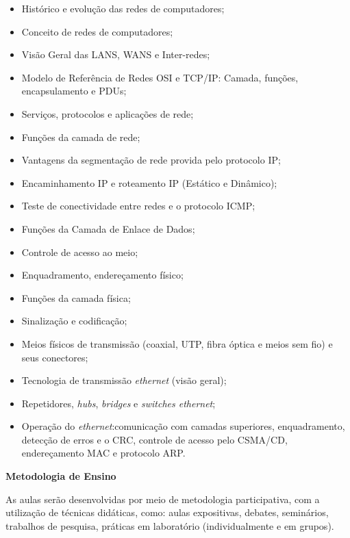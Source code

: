 \begin{itemize}

 \item Histórico e evolução das redes de computadores;
 \item Conceito de redes de computadores;
 \item Visão Geral das LANS, WANS e Inter-redes;
 \item Modelo de Referência de Redes OSI e TCP/IP: Camada, funções, encapsulamento e PDUs;
 \item Serviços, protocolos e aplicações de rede;
 \item Funções da camada de rede;
 \item Vantagens da segmentação de rede provida pelo protocolo IP;
 \item Encaminhamento IP e roteamento IP (Estático e Dinâmico);
 \item Teste de conectividade entre redes e o protocolo ICMP;
 \item Funções da Camada de Enlace de Dados;
 \item Controle de acesso ao meio;
 \item Enquadramento, endereçamento físico;
 \item Funções da camada física;
 \item Sinalização e codificação;
 \item Meios físicos de transmissão (coaxial, UTP, fibra óptica e meios sem fio) e seus conectores;
 \item Tecnologia de transmissão \textit{ethernet} (visão geral);
 \item Repetidores, \textit{hubs}, \textit{bridges} e \textit{switches ethernet};
 \item Operação do \textit{ethernet}:comunicação com camadas superiores, enquadramento, detecção de erros e o CRC, controle de acesso pelo CSMA/CD, endereçamento MAC e protocolo ARP.
 
\end{itemize}

\begin{snugshade}\begin{center}\textbf{
    Metodologia de Ensino
}\end{center}\end{snugshade}

\noindent
   As aulas serão desenvolvidas por meio de metodologia participativa, com a utilização de técnicas didáticas, como: aulas expositivas, debates, seminários, trabalhos de pesquisa, práticas em laboratório (individualmente e em grupos).

